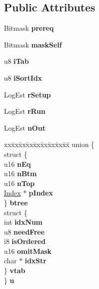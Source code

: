\subsection*{Public Attributes}
\begin{DoxyCompactItemize}
\item 
Bitmask {\bfseries prereq}\hypertarget{structWhereLoop_aa654af6ecff71bd43c4b0cd6046ccf4d}{}\label{structWhereLoop_aa654af6ecff71bd43c4b0cd6046ccf4d}

\item 
Bitmask {\bfseries mask\+Self}\hypertarget{structWhereLoop_a0118b20be771241ee29de452ffead61e}{}\label{structWhereLoop_a0118b20be771241ee29de452ffead61e}

\item 
u8 {\bfseries i\+Tab}\hypertarget{structWhereLoop_a469ad31ae7f3b025667813e2d0aa9d01}{}\label{structWhereLoop_a469ad31ae7f3b025667813e2d0aa9d01}

\item 
u8 {\bfseries i\+Sort\+Idx}\hypertarget{structWhereLoop_a35e725c988b2bcfb9633a259cd6eba58}{}\label{structWhereLoop_a35e725c988b2bcfb9633a259cd6eba58}

\item 
Log\+Est {\bfseries r\+Setup}\hypertarget{structWhereLoop_a5e28f2d1299993056255158d33baea33}{}\label{structWhereLoop_a5e28f2d1299993056255158d33baea33}

\item 
Log\+Est {\bfseries r\+Run}\hypertarget{structWhereLoop_a1a67183b699c90c23940f540486b07d6}{}\label{structWhereLoop_a1a67183b699c90c23940f540486b07d6}

\item 
Log\+Est {\bfseries n\+Out}\hypertarget{structWhereLoop_aaef49d7d8188f3dd94d0c9fd0e727448}{}\label{structWhereLoop_aaef49d7d8188f3dd94d0c9fd0e727448}

\item 
\begin{tabbing}
xx\=xx\=xx\=xx\=xx\=xx\=xx\=xx\=xx\=\kill
union \{\\
\>struct \{\\
\>\>u16 {\bfseries nEq}\\
\>\>u16 {\bfseries nBtm}\\
\>\>u16 {\bfseries nTop}\\
\>\>\hyperlink{structIndex}{Index} $\ast$ {\bfseries pIndex}\\
\>\} {\bfseries btree}\\
\>struct \{\\
\>\>int {\bfseries idxNum}\\
\>\>u8 {\bfseries needFree}\\
\>\>i8 {\bfseries isOrdered}\\
\>\>u16 {\bfseries omitMask}\\
\>\>char $\ast$ {\bfseries idxStr}\\
\>\} {\bfseries vtab}\\
\} {\bfseries u}\hypertarget{structWhereLoop_a2d0f2223d61e33af42ce49c46c35174d}{}\label{structWhereLoop_a2d0f2223d61e33af42ce49c46c35174d}
\\


\end{tabbing}
\end{DoxyCompactItemize}
